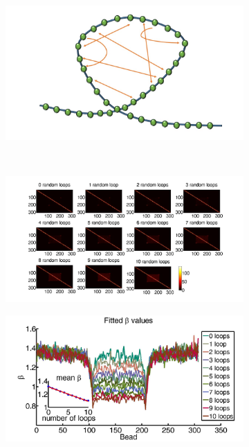 \documentclass[12pt]{article}
\begin{document}
\begin{figure}[H]
\begin{subfigure}[b]{0.1\textwidth}
\includegraphics[scale=0.15]{polymerModelWithOneFixedLoopAndInternalConnections}
\caption{}
\end{subfigure}
~~~~~~~~~~~~~~~~
\begin{subfigure}[b]{0.2\textwidth}
\includegraphics[scale=0.2]{encounterHistogramOneFixedLoop1To10RandomLoops307Beads}
\caption{}
\end{subfigure}

\begin{subfigure}[b]{0.2\textwidth}
\includegraphics[scale=0.2]{fittedExpOneFixedLoop1To10RandomLoops307Beads}
\caption{}
\end{subfigure}


\end{figure}
\end{document}
